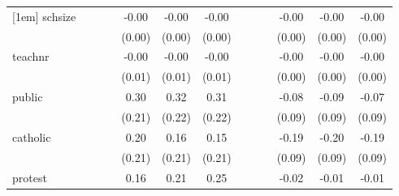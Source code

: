 \documentclass{article}
\begin{document}
{\begin{tabular}{l*{12}{c}}
[1em]
schsize     &                     &                     &                     &       -0.00         &       -0.00         &       -0.00         &                     &                     &                     &       -0.00         &       -0.00         &       -0.00         \\
            &                     &                     &                     &      (0.00)         &      (0.00)         &      (0.00)         &                     &                     &                     &      (0.00)         &      (0.00)         &      (0.00)         \\
[1em]
teachnr     &                     &                     &                     &       -0.00         &       -0.00         &       -0.00         &                     &                     &                     &       -0.00         &       -0.00         &       -0.00         \\
            &                     &                     &                     &      (0.01)         &      (0.01)         &      (0.01)         &                     &                     &                     &      (0.00)         &      (0.00)         &      (0.00)         \\
[1em]
public      &                     &                     &                     &        0.30         &        0.32         &        0.31         &                     &                     &                     &       -0.08         &       -0.09         &       -0.07         \\
            &                     &                     &                     &      (0.21)         &      (0.22)         &      (0.22)         &                     &                     &                     &      (0.09)         &      (0.09)         &      (0.09)         \\
[1em]
catholic    &                     &                     &                     &        0.20         &        0.16         &        0.15         &                     &                     &                     &       -0.19\sym{**} &       -0.20\sym{**} &       -0.19\sym{**} \\
            &                     &                     &                     &      (0.21)         &      (0.21)         &      (0.21)         &                     &                     &                     &      (0.09)         &      (0.09)         &      (0.09)         \\
[1em]
protest     &                     &                     &                     &        0.16         &        0.21         &        0.25         &                     &                     &                     &       -0.02         &       -0.01         &       -0.01         \\

\end{tabular}}
\end{document}
